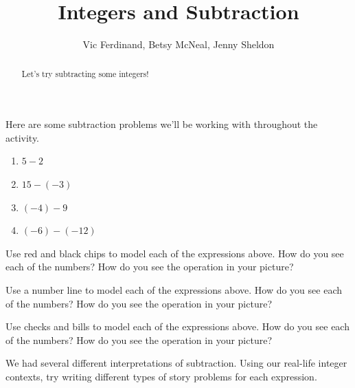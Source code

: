 \documentclass[nooutcomes,noauthor,handout]{ximera}
\title{Integers and Subtraction}
\author{Vic Ferdinand, Betsy McNeal, Jenny Sheldon}
\begin{document}
\begin{abstract}
    Let's try subtracting some integers!
\end{abstract}
\maketitle



Here are some subtraction problems we'll be working with throughout the activity.

\begin{enumerate}
    \item $5 - 2$
    \item $15 - (-3)$
    \item $(-4) - 9$
    \item $(-6) - (-12)$
\end{enumerate}



\begin{problem}
Use red and black chips to model each of the expressions above. How do you see each of the numbers? How do you see the operation in your picture?

\end{problem}




\begin{problem}
Use a number line to model each of the expressions above. How do you see each of the numbers? How do you see the operation in your picture?  
\end{problem}

\begin{problem}
Use checks and bills to model each of the expressions above. How do you see each of the numbers? How do you see the operation in your picture?  
\end{problem}



\begin{problem}
We had several different interpretations of subtraction.  Using our real-life integer contexts, try writing different types of story problems for each expression.
\end{problem}
\end{document}

